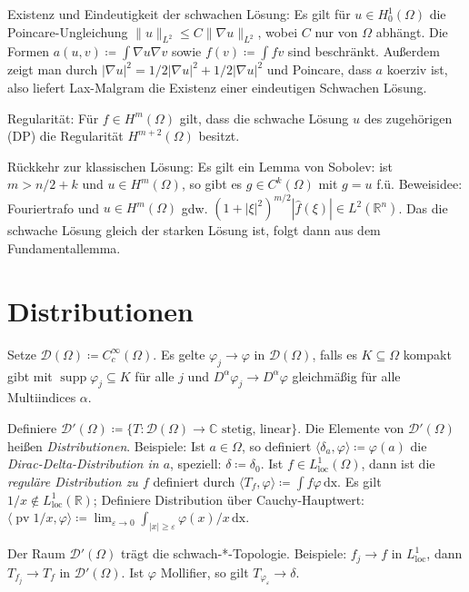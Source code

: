\documentclass[11pt,a4paper]{scrartcl}
\newcommand{\R}{\mathbb{R}} %
\newcommand{\C}{\mathbb{C}} %
\newcommand{\D}{\mathcal{D}}
\newcommand{\norm}[1]{\|#1\|}
\theoremstyle{plain}
\theoremstyle{definition}
\theoremstyle{remark}
\DeclareMathOperator{\supp}{supp}
\DeclareMathOperator{\loc}{loc}
\DeclareMathOperator{\pv}{pv}
\begin{document}
Existenz und Eindeutigkeit der schwachen Lösung: Es gilt für $u\in H^1_0(\Omega)$ die Poincare-Ungleichung $\norm{u}_{L^2} \leq C \norm{\nabla u}_{L^2}$, wobei $C$ nur von $\Omega$ abhängt. Die Formen $a(u,v)\coloneqq \int \nabla u \nabla v$ sowie $f(v)\coloneqq \int fv$ sind beschränkt. Außerdem zeigt man durch $|\nabla u|^2 = 1/2|\nabla u|^2 + 1/2|\nabla u|^2$ und Poincare, dass $a$ koerziv ist, also liefert Lax-Malgram die Existenz einer eindeutigen Schwachen Lösung.

Regularität: Für $f\in H^m(\Omega)$ gilt, dass die schwache Lösung $u$ des zugehörigen (DP) die Regularität $H^{m+2}(\Omega)$ besitzt.

Rückkehr zur klassischen Lösung: Es gilt ein Lemma von Sobolev: ist $m > n/2 + k$ und $u\in H^m(\Omega)$, so gibt es $g\in C^k(\Omega)$ mit $g=u$ f.ü. Beweisidee: Fouriertrafo und $u\in H^m(\Omega)$ gdw. $(1+|\xi|^2)^{m/2} |\hat f(\xi)| \in L^2(\R^n)$. Das die schwache Lösung gleich der starken Lösung ist, folgt dann aus dem Fundamentallemma.

\section{Distributionen}

Setze $\D(\Omega)\coloneqq C_c^\infty(\Omega)$. Es gelte $\varphi_j \to \varphi$ in $\D(\Omega)$, falls es $K\subseteq \Omega$ kompakt gibt mit $\supp \varphi_j \subseteq K$ für alle $j$ und $D^\alpha \varphi_j \to D^\alpha \varphi$ gleichmäßig für alle Multiindices $\alpha$.

Definiere $\D'(\Omega)\coloneqq \{ T: \D(\Omega) \to \C \text{ stetig, linear} \}$. Die Elemente von $\D'(\Omega)$ heißen \emph{Distributionen}. Beispiele: Ist $a\in \Omega$, so definiert $\langle \delta_a, \varphi \rangle \coloneqq \varphi(a)$ die \emph{Dirac-Delta-Distribution in $a$}, speziell: $\delta \coloneqq \delta_0$. Ist $f\in L^1_{\loc}(\Omega)$, dann ist die \emph{reguläre Distribution zu $f$} definiert durch $\langle T_f, \varphi \rangle \coloneqq \int f\varphi \, \mathrm{dx}$. Es gilt $1/x\not\in L^1_{\loc}(\R)$; Definiere Distribution über Cauchy-Hauptwert: $\langle \pv 1/x, \varphi \rangle \coloneqq \lim_{\varepsilon \to 0} \int_{|x|\geq \varepsilon} \varphi(x)/x \, \mathrm{dx}$.

Der Raum $\D'(\Omega)$ trägt die schwach-*-Topologie. Beispiele: $f_j\to f$ in $L^1_{\loc}$, dann $T_{f_j}\to T_f$ in $\D'(\Omega)$. Ist $\varphi$ Mollifier, so gilt $T_{\varphi_\varepsilon}\to \delta$.
\end{document}
